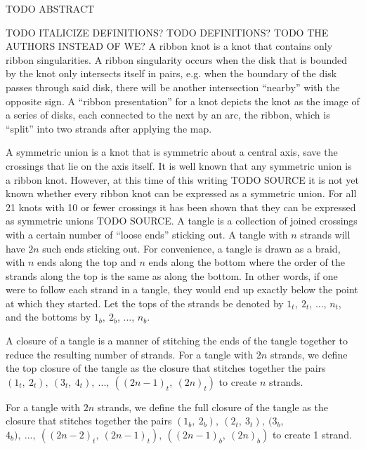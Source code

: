 

\begin{paperabstract}
TODO ABSTRACT
\end{paperabstract}
\begin{paper}
\theorems
TODO ITALICIZE DEFINITIONS?
TODO DEFINITIONS?
TODO THE AUTHORS INSTEAD OF WE?
A ribbon knot is a knot that contains only ribbon singularities.
A ribbon singularity occurs when the disk that is bounded by the knot only
intersects itself in pairs, e.g. when the boundary of the disk passes through
said disk, there will be another intersection ``nearby'' with the opposite sign.
A ``ribbon presentation'' for a knot depicts the knot as the image of a series
of disks, each connected to the next by an arc, the ribbon, which is ``split''
into two strands after applying the map.

A symmetric union is a knot that is symmetric about a central axis, save the
crossings that lie on the axis itself.
It is well known that any symmetric union is a ribbon knot.
However, at this time of this writing TODO SOURCE it is not yet known whether
every ribbon knot can be expressed as a symmetric union.
For all 21 knots with 10 or fewer crossings it has been shown that they can be
expressed as symmetric unions TODO SOURCE.
A tangle is a collection of joined crossings with a certain number of ``loose
ends'' sticking out.
A tangle with $n$ strands will have $2n$ such ends sticking out.
For convenience, a tangle is drawn as a braid, with $n$ ends along the top and
$n$ ends along the bottom where the order of the strands along the top is the
same as along the bottom.
In other words, if one were to follow each strand in a tangle, they would end up
exactly below the point at which they started.
Let the tops of the strands be denoted by $1_t,~2_t$, ..., $n_t$, and the
bottoms  by $1_b,~2_b$, ..., $n_b$.


A closure of a tangle is a manner of stitching the ends of the tangle together
to reduce the resulting number of strands.
For a tangle with $2n$ strands, we define the top closure of the tangle as the
closure that stitches together the pairs
$(1_t,~2_t),~(3_t,~4_t),~...,~((2n-1)_t,~(2n)_t)$ to create $n$ strands.


For a tangle with $2n$ strands, we define the full closure of the tangle as the
closure that stitches together the pairs $(1_b,~2_b),~(2_t,~3_t),~(3_b$,
$4_b),~...,~((2n-2)_t,~(2n-1)_t),~((2n-1)_b,~(2n)_b)$ to create 1 strand.


\end{paper}

